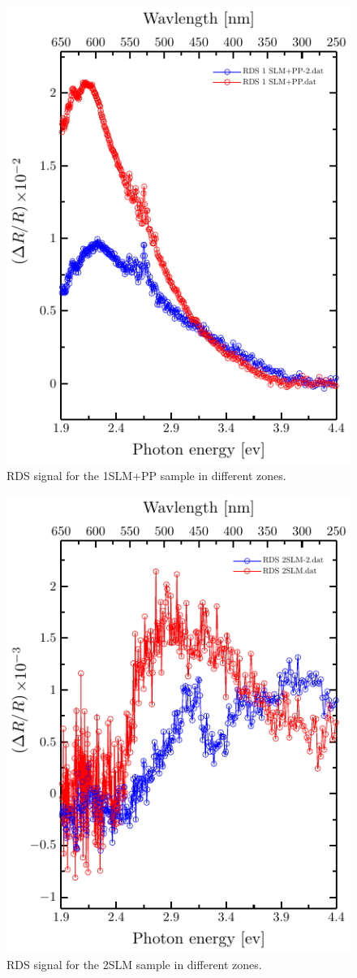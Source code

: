 \begin{figure}
	\centering
	\includegraphics[width=0.5\linewidth]{"FIGURES/Anexo-CuSn/RDS1SLM+PP-2"}
	\caption{RDS signal for the 1SLM+PP sample in different zones.}
	\label{fig:rds-1-slmpp-2}
\end{figure}

\begin{figure}
	\centering
	\includegraphics[width=0.5\linewidth]{"FIGURES/Anexo-CuSn/RDS2SLM-2"}
	\caption{RDS signal for the 2SLM sample in different zones. }
	\label{fig:rds-1-slmpp-2}
\end{figure}

